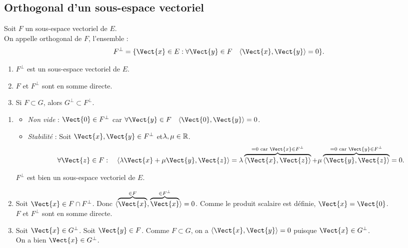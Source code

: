 \documentclass{book}
\begin{document}
\subsection{Orthogonal d'un sous-espace vectoriel}
\begin{Definition}
Soit $F$ un sous-espace vectoriel de $E$.\\
On appelle orthogonal de $F$, l'ensemble :
$$F^{\perp}=\{ \Vect{x}\in E : \forall \Vect{y}\in F \quad \PS{\Vect{x}}{\Vect{y}}=0 \}. $$ 
  \centering
{}

\end{Definition}
\begin{Proposition}
\begin{enumerate}
\item $F^{\perp}$ est un sous-espace vectoriel de $E$.
\item $F$ et $F^{\perp}$ sont en somme directe.
 \item Si $F\subset G$, alors $G^{\perp}\subset F^{\perp}.$ 
\end{enumerate}
\end{Proposition}
\begin{Demonstration}
\begin{enumerate}
\item 
\begin{itemize}
\item \textit{Non vide} : $\Vect{0}\in F^{\perp}$ car  $\forall \Vect{y}\in F \quad \PS{\Vect{0}}{\Vect{y}}=0$.
\item  \textit{Stabilité} : Soit $\Vect{x},\Vect{y}\in F^{\perp}$ et$\lambda,\mu\in\mathbb{R}$.
$$\forall \Vect{z}\in F:  \quad \PS{\lambda\Vect{x}+\mu \Vect{y}}{\Vect{z}}=\lambda\overbrace{\PS{\Vect{x}}{\Vect{z}}}^{=0\text{ car }\Vect{x}\in F^{\perp}}+\mu\overbrace{\PS{ \Vect{y}}{\Vect{z}}}^{=0\text{ car }\Vect{y}\in F^{\perp}}=0.$$
\end{itemize}
$F^{\perp}$ est bien un sous-espace vectoriel de $E$.
\item  
Soit $\Vect{x}\in F\cap F^{\perp}$.  Donc $\PS{\overbrace{\Vect{x}}^{\in F}}{\overbrace{\Vect{x}}^{\in F^{\perp}}}=0$. Comme le produit scalaire est définie,  $\Vect{x}=\Vect{0}$.\\
$F$ et $F^{\perp}$ sont en somme directe.
\item Soit $\Vect{x}\in G^{\perp}$. Soit $\Vect{y}\in F$. Comme $F\subset G$, on a  $\PS{\Vect{x}}{\Vect{y}}=0$ puisque $\Vect{x}\in G^{\perp}$. \\
On a bien $\Vect{x}\in G^{\perp}$.
\end{enumerate}
\end{Demonstration}
\end{document}
